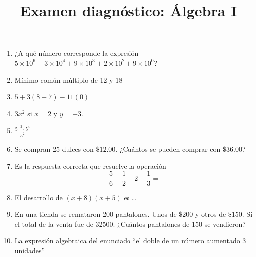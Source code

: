 \documentclass{article}
\title{Examen diagnóstico: Álgebra I}
\begin{document}
\maketitle
\begin{enumerate}
    \item ¿A qué número corresponde la expresión \(5\times 10^6 + 3\times 10^4 + 9\times 10^3 + 2\times 10^2 + 9\times 10^0\)?
    \item Mínimo común múltiplo de 12 y 18
    \item \(5 + 3(8 - 7) - 11(0)\)
    \item \(3x^2\) si \(x = 2\) y \(y = -3\).
    \item \(\frac{5^{-2}\cdot5^4}{5^2}\)
    \item Se compran 25 dulces con \(\mathdollar 12.00\). ¿Cuántos se pueden comprar con \(\mathdollar 36.00\)?
    \item Es la respuesta correcta que resuelve la operación \[\frac{5}{6} - \frac{1}{2} + 2 - \frac{1}{3} = \]
    \item El desarrollo de \((x + 8)(x + 5)\) es \dots
    \item En una tienda se remataron 200 pantalones. Unos de \(\mathdollar 200\) y otros de \(\mathdollar 150\). Si el total de la venta fue de 32500. ¿Cuántos pantalones de 150 se vendieron?
    \item La expresión algebraica del enunciado ``el doble de un número aumentado 3 unidades''
\end{enumerate}
\end{document}
